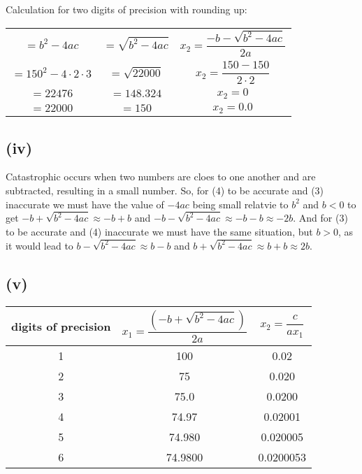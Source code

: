 \documentclass[11pt]{article}
\begin{document}
Calculation for two digits of precision with rounding up:
\begin{center}
\begin{tabular}{ |l|l|l| }
\[=b^2-4ac\]                & \[=\sqrt{b^2-4ac}\]     & \[x_2=\frac{-b-\sqrt{b^2-4ac}}{2a}\] \\
\[=150^2-4\cdot 2\cdot 3 \] & \[=\sqrt{22000}\]       & \[x_2=\frac{150-150}{2\cdot 2}\] \\
\[=22476\]                  & \[=148.324\]            & \[x_2=0\] \\
\[=22000\]                  & \[=150\]                & \[x_2=0.0\] \\
\end{tabular}
\end{center}
\subsection{(iv)}
\label{sec:org38095e2}
Catastrophic occurs when two numbers are cloes to one another and are subtracted, resulting in a small number. So, for (4) to be accurate and (3) inaccurate we must have the value of \(-4ac\) being small relatvie to \(b^2\) and \(b<0\) to get \(-b+\sqrt{b^2-4ac}\approx -b+b\) and \(-b-\sqrt{b^2-4ac}\approx -b-b\approx -2b\). And for (3) to be accurate and (4) inaccurate we must have the same situation, but \(b>0\), as it would lead to \(b-\sqrt{b^2-4ac}\approx b-b\) and \(b+\sqrt{b^2-4ac} \approx b+b \approx 2b\).
\subsection{(v)}
\label{sec:orga5b438b}
\begin{center}
\begin{tabular}{ |c|c|c| }
\hline
 digits of precision & \[x_1=\frac{(-b+\sqrt{b^2-4ac})}{2a}\] & \[x_2=\frac{c}{ax_1}\]  \\ \hline
1                    & 100                                    & 0.02                   \\ \hline
2                    & 75                                     & 0.020                 \\ \hline
3                    & 75.0                                   & 0.0200                 \\ \hline
4                    & 74.97                                  & 0.02001                \\ \hline
5                    & 74.980                                 & 0.020005               \\ \hline
6                    & 74.9800                                & 0.0200053              \\ \hline
\end{tabular}
\end{center}
\end{document}

